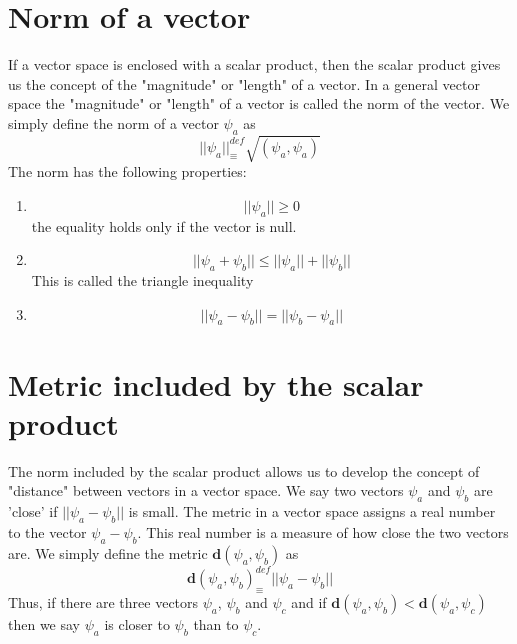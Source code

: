 \section{Norm of a vector}
If a vector space is enclosed with a scalar product, then the scalar product gives us the concept of the "magnitude" or "length" of a vector. In a general vector space the "magnitude" or "length" of a vector is called the norm of the vector. We simply define the norm of a vector $\psi_a$ as
\begin{equation}\label{eqn:2.51}
||\psi_a|| _\equiv^{def} \sqrt{(\psi_a, \psi_a)}
\end{equation}
The norm has the following properties:
\begin{enumerate}
	\item 
	\begin{equation}\label{eqn:2.52}
	||\psi_a|| \geq 0
	\end{equation}
	the equality holds only if the vector is null.
	
	\item 
	\begin{equation}\label{eqn:2.53}
	||\psi_a + \psi_b|| \leq ||\psi_a|| + ||\psi_b||
	\end{equation}
	This is called the triangle inequality
	
	\item 
	\begin{equation}\label{eqn:2.54}
	||\psi_a - \psi_b|| = ||\psi_b - \psi_a||
	\end{equation}
\end{enumerate}

\section{Metric included by the scalar product}
The norm included by the scalar product allows us to develop the concept of "distance" between vectors in a vector space. We say two vectors $\psi_a$ and $\psi_b$ are 'close' if $||\psi_a - \psi_b||$ is small. The metric in a vector space assigns a real number to the vector $\psi_a - \psi_b$. This real number is a measure of how close the two vectors are. We simply define the metric $\mathbf{d}(\psi_a, \psi_b)$ as
\begin{equation}\label{eqn:2.55}
\mathbf{d}(\psi_a, \psi_b) _\equiv^{def} ||\psi_a - \psi_b||
\end{equation}
Thus, if there are three vectors $\psi_a$, $\psi_b$ and $\psi_c$ and if $\mathbf{d}(\psi_a, \psi_b) < \mathbf{d}(\psi_a, \psi_c)$ then we say $\psi_a$ is closer to $\psi_b$ than to $\psi_c$.

